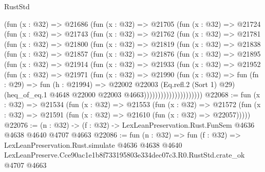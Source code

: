 \begin{lexlean}{RustStd}
\begin{coremodule}
        (fun (x : @32) =>
        @21686
          (fun (x : @32) =>
          @21705
            (fun (x : @32) =>
            @21724
              (fun (x : @32) =>
              @21743
                (fun (x : @32) =>
                @21762
                  (fun (x : @32) =>
                  @21781
                    (fun (x : @32) =>
                    @21800
                      (fun (x : @32) =>
                      @21819
                        (fun (x : @32) =>
                        @21838
                          (fun (x : @32) =>
                          @21857
                            (fun (x : @32) =>
                            @21876
                              (fun (x : @32) =>
                              @21895
                                (fun (x : @32) =>
                                @21914
                                  (fun (x : @32) =>
                                  @21933
                                    (fun (x : @32) =>
                                    @21952
                                      (fun (x : @32) =>
                                      @21971
                                        (fun (x : @32) =>
                                        @21990
                                          (fun (x : @32) =>
                                          fun (fn : @29) =>
                                          fun (h : @21994) =>
                                          @22002
                                            @22003
                                            (Eq.refl.{2} (Sort 1) @29)
                                            (heq_of_eq.{1}
                                              @4648
                                              @22000
                                              @22003
                                              @4663)))))))))))))))))))))
@22068 := fun (x : @32) =>
  @21534
    (fun (x : @32) =>
    @21553
      (fun (x : @32) =>
      @21572 (fun (x : @32) => @21591 (fun (x : @32) => @21610 (fun (x : @32) => @22057)))))
@22076 := (n : @32) -> (f : @32) -> LexLeanPreservation.Rust.FunSem @4636 @4638 @4640 @4707 @4663
@22086 := fun (n : @32) =>
  fun (f : @32) =>
  LexLeanPreservation.Rust.simulate
    @4636
    @4638
    @4640
    LexLeanPreserve.Cce90ac1e1b8f733195803e334dec07c3.R0.RustStd.crate_ok
    @4707
    @4663
\end{coremodule}
\end{lexlean}
